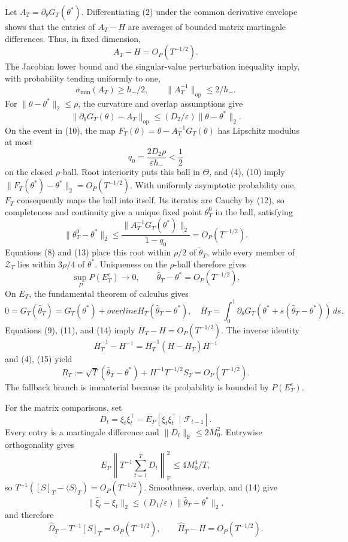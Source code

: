 Let \(A_T=\partial_\theta G_T(\theta^*)\). Differentiating (2) under the common derivative envelope shows that the entries of \(A_T-H\) are averages of bounded matrix martingale differences. Thus, in fixed dimension,
\[
 A_T-H=O_P(T^{-1/2}).
\tag{9}
\]
The Jacobian lower bound and the singular-value perturbation inequality imply, with probability tending uniformly to one,
\[
 \sigma_{\min}(A_T)\ge h_-/2,
 \qquad \|A_T^{-1}\|_{\mathrm{op}}\le2/h_-.
\tag{10}
\]
For \(\|\theta-\theta^*\|_2\le\rho\), the curvature and overlap assumptions give
\[
 \|\partial_\theta G_T(\theta)-A_T\|_{\mathrm{op}}
 \le(D_2/\varepsilon)\|\theta-\theta^*\|_2.
\tag{11}
\]
On the event in (10), the map \(F_T(\theta)=\theta-A_T^{-1}G_T(\theta)\) has Lipschitz modulus at most
\[
 q_0=\frac{2D_2\rho}{\varepsilon h_-}<\frac12
\tag{12}
\]
on the closed \(\rho\)-ball. Root interiority puts this ball in \(\Theta\), and (4), (10) imply \(\|F_T(\theta^*)-\theta^*\|_2=O_P(T^{-1/2})\). With uniformly asymptotic probability one, \(F_T\) consequently maps the ball into itself. Its iterates are Cauchy by (12), so completeness and continuity give a unique fixed point \(\theta_T^0\) in the ball, satisfying
\[
 \|\theta_T^0-\theta^*\|_2
 \le\frac{\|A_T^{-1}G_T(\theta^*)\|_2}{1-q_0}
 =O_P(T^{-1/2}).
\tag{13}
\]
Equations (8) and (13) place this root within \(\rho/2\) of \(\widetilde\theta_T\), while every member of \(\mathcal Z_T\) lies within \(3\rho/4\) of \(\theta^*\). Uniqueness on the \(\rho\)-ball therefore gives
\[
 \sup_P P(E_T^c)\longrightarrow0,
 \qquad \widehat\theta_T-\theta^*=O_P(T^{-1/2}).
\tag{14}
\]
On \(E_T\), the fundamental theorem of calculus gives
\[
 0=G_T(\widehat\theta_T)=G_T(\theta^*)+overline H_T
 (\widehat\theta_T-\theta^*),
 \quad
 \overline H_T=\int_0^1\partial_\theta G_T
 (\theta^*+s(\widehat\theta_T-\theta^*))\,ds.
\tag{15}
\]
Equations (9), (11), and (14) imply \(\overline H_T-H=O_P(T^{-1/2})\). The inverse identity
\[
 \overline H_T^{-1}-H^{-1}
 =\overline H_T^{-1}(H-\overline H_T)H^{-1}
\tag{16}
\]
and (4), (15) yield
\[
 R_T:=\sqrt T(\widehat\theta_T-\theta^*)
 +H^{-1}T^{-1/2}S_T=O_P(T^{-1/2}).
\tag{17}
\]
The fallback branch is immaterial because its probability is bounded by \(P(E_T^c)\).

For the matrix comparisons, set
\[
 D_t=\xi_t\xi_t^\top-E_P[\xi_t\xi_t^\top\mid\mathcal F_{t-1}].
\tag{18}
\]
Every entry is a martingale difference and \(\|D_t\|_{\mathrm F}\le2M_0^2\). Entrywise orthogonality gives
\[
 E_P\left\|T^{-1}\sum_{t=1}^TD_t\right\|_{\mathrm F}^2
 \le4M_0^4/T,
\tag{19}
\]
so \(T^{-1}([S]_T-\langle S\rangle_T)=O_P(T^{-1/2})\). Smoothness, overlap, and (14) give
\[
 \|\widehat\xi_t-\xi_t\|_2
 \le(D_1/\varepsilon)\|\widehat\theta_T-\theta^*\|_2,
\tag{20}
\]
and therefore
\[
 \widehat\Omega_T-T^{-1}[S]_T=O_P(T^{-1/2}),
 \qquad \widehat H_T-H=O_P(T^{-1/2}).
\tag{21}
\]

